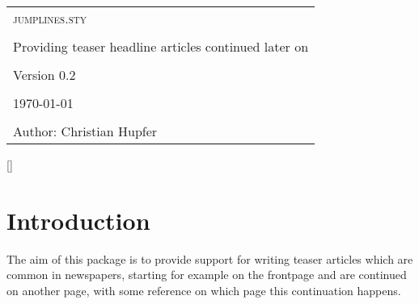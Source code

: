 \documentclass[12pt,english]{ltxdoc}
\def\packageversion{0.2}%
\newcommand{\PackageDocName}{jumplines.sty}%
\begin{document}
\mmddyyyydate


\setlength{\parindent}{0pt}

\thispagestyle{empty}%

\begin{center}
\begin{tcolorbox}[boxrule=1mm,arc=4mm,colback=yellow!30!white,width=0.8\textwidth]
\large \bfseries%
\begin{center}%
\begin{tabular}{C{0.7\textwidth}}%
\textsc{\PackageDocName} \tabularnewline
\tabularnewline
Providing teaser headline articles continued later on \tabularnewline
\tabularnewline
Version \packageversion \tabularnewline
\tabularnewline
\today \tabularnewline
\tabularnewline
\addtocounter{footnote}{2}
Author: Christian Hupfer\(^\mathrm{\fnsymbol{footnote}}\)%
\tabularnewline
\end{tabular}
\end{center}
\end{tcolorbox}
\makeatletter
\renewcommand{\thefootnote}{\fnsymbol{footnote}}%
%
\makeatother
\end{center}

\clearpage
\tableofcontents




\pagestyle{scrheadings}%
\setheadsepline{2pt}[\color{blue}]

\setcounter{footnote}{0}


\section{Introduction}

The aim of this package is to provide support for writing teaser articles which are common in newspapers, starting for example on the frontpage and are continued on another page, with some reference on which page this continuation happens.

%

%

\ShipoutArticleTeasers%
\end{document}
